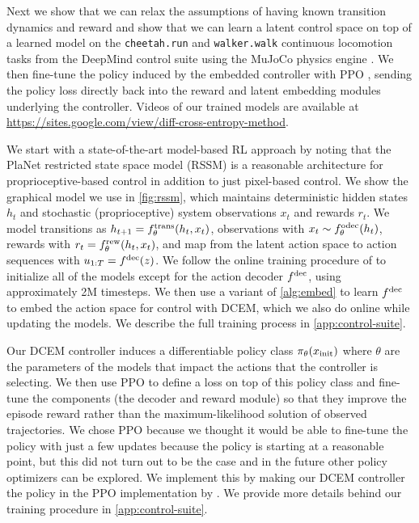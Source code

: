 \documentclass{article}
\begin{document}
Next we show that we can relax the assumptions of having
known transition dynamics and reward and show that we can
learn a latent control space on top of a learned model
on the \verb!cheetah.run! and \verb!walker.walk!
continuous locomotion tasks from the DeepMind control
suite \citep{tassa2018deepmind} using the MuJoCo
physics engine \citep{todorov2012mujoco}.
We then fine-tune the policy induced by the embedded
controller with PPO \citep{schulman2017proximal},
sending the policy loss directly back into the reward
and latent embedding modules underlying the controller.
Videos of our trained models are available at
\href{https://sites.google.com/view/diff-cross-entropy-method}{https://sites.google.com/view/diff-cross-entropy-method}.

We start with a state-of-the-art model-based RL approach
by noting that the PlaNet \citep{hafner2018learning}
restricted state space model (RSSM) is a reasonable
architecture for proprioceptive-based control in addition
to just pixel-based control.
We show the graphical model we use in \cref{fig:rssm},
which maintains deterministic hidden states
$h_t$ and stochastic (proprioceptive) system observations
$x_t$ and rewards $r_t$.
We model transitions as $h_{t+1}=f^{\mathrm{trans}}_\theta(h_t, x_t)$,
observations with $x_t\sim f^{\mathrm{odec}}_\theta(h_t)$,
rewards with $r_t = f^{\mathrm{rew}}_\theta(h_t, x_t)$,
and map from the latent action space to action sequences
with $u_{1:T}=f^{\mathrm{dec}}(z)$.
We follow the online training procedure of \citet{hafner2018learning}
to initialize all of the models except for the action
decoder $f^{\mathrm{dec}}$, using approximately 2M timesteps.
We then use a variant of \cref{alg:embed} to learn $f^{\mathrm{dec}}$ to
embed the action space for control with DCEM, which we also
do online while updating the models.
We describe the full training process in
\cref{app:control-suite}.

Our DCEM controller induces a differentiable policy class
$\pi_\theta(x_{\rm init})$ where $\theta$ are the parameters of
the models that impact the actions that the controller
is selecting.
We then use PPO to define a loss on top of this policy
class and fine-tune the components (the decoder and reward module)
so that they improve the episode reward rather than
the maximum-likelihood solution of observed trajectories.
We chose PPO because we thought it would be able to fine-tune
the policy with just a few updates because the policy
is starting at a reasonable point, but this did not
turn out to be the case and in the future other policy
optimizers can be explored.
We implement this by making our DCEM controller the
policy in the PPO implementation by \citet{pytorchrl}.
We provide more details behind our training procedure in
\cref{app:control-suite}.
\end{document}
